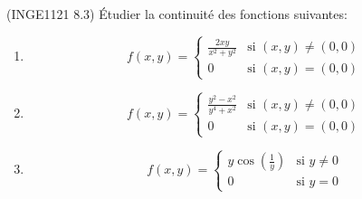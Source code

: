 

\begin{exercice}\label{exoFoncDeuxVar0012}

	(INGE1121 8.3) Étudier la continuité des fonctions suivantes:
	\begin{enumerate}

		\item
			\begin{equation}
				f(x,y)=\begin{cases}
					\frac{ 2xy }{ x^2+y^2 }	&	\text{si }(x,y)\neq(0,0)\\
					0	&	 \text{si }(x,y)=(0,0)
				\end{cases}
			\end{equation}
		\item
			\begin{equation}
				f(x,y)=\begin{cases}
					\frac{ y^2-x^2 }{ y^4+x^2 }	&	\text{si }(x,y)\neq(0,0)\\
					0	&	 \text{si }(x,y)=(0,0)
				\end{cases}
			\end{equation}
			
		\item
			\begin{equation}
				f(x,y)=\begin{cases}
					y\cos(\frac{1}{ y })	&	\text{si }y\neq 0\\
					0	&	 \text{si }y=0
				\end{cases}
			\end{equation}
	\end{enumerate}

\end{exercice}
